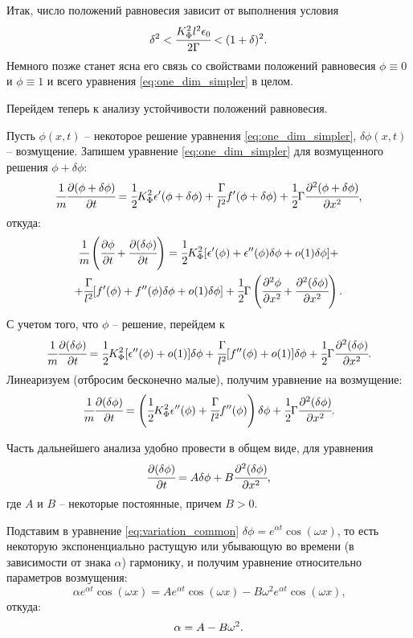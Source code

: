 Итак, число положений равновесия зависит от выполнения условия
\begin{equation}
	\delta^2 < \cfrac{K_\Phi^2 l^2 \epsilon_0}{2 \Gamma} < (1 + \delta)^2 {\text{.}}
	\label{cond:equilibriums_number}
\end{equation}
Немного позже станет ясна его связь со свойствами положений равновесия $\phi \equiv 0$ и $\phi \equiv 1$ и всего уравнения \eqref{eq:one_dim_simpler} в целом.

Перейдем теперь к анализу устойчивости положений равновесия.

Пусть $\phi(x, t)$ -- некоторое решение уравнения \eqref{eq:one_dim_simpler}, $\delta \phi(x, t)$ -- возмущение. Запишем уравнение \eqref{eq:one_dim_simpler} для возмущенного решения $\phi + \delta \phi$:
$$\cfrac{1}{m} \cfrac{\partial (\phi + \delta \phi)}{\partial t} = \cfrac{1}{2} K_\Phi^2 \epsilon'(\phi + \delta \phi) + \cfrac{\Gamma}{l^2} f'(\phi + \delta \phi) + \cfrac{1}{2} \Gamma \cfrac{\partial^2 (\phi + \delta \phi)}{\partial x^2} {\text{,}}$$
откуда:
\begin{multline*}
	\cfrac{1}{m} \left( \cfrac{\partial \phi}{\partial t} + \cfrac{\partial (\delta \phi)}{\partial t} \right) = \cfrac{1}{2} K_\Phi^2 [\epsilon'(\phi) + \epsilon''(\phi) \delta \phi + o(1) \delta \phi] + \\ + \cfrac{\Gamma}{l^2} [f'(\phi) + f''(\phi) \delta \phi + o(1) \delta \phi] + \cfrac{1}{2} \Gamma \left( \cfrac{\partial^2 \phi}{\partial x^2} + \cfrac{\partial^2 (\delta \phi)}{\partial x^2} \right) {\text{.}}
\end{multline*}
С учетом того, что $\phi$ -- решение, перейдем к
$$\cfrac{1}{m} \cfrac{\partial (\delta \phi)}{\partial t} = \cfrac{1}{2} K_\Phi^2 [\epsilon''(\phi) + o(1)] \delta \phi + \cfrac{\Gamma}{l^2} [f''(\phi) + o(1)] \delta \phi + \cfrac{1}{2} \Gamma \cfrac{\partial^2 (\delta \phi)}{\partial x^2} {\text{.}}$$
Линеаризуем (отбросим бесконечно малые), получим уравнение на возмущение:
\begin{equation}
	\cfrac{1}{m} \cfrac{\partial (\delta \phi)}{\partial t} = \left(\cfrac{1}{2} K_\Phi^2 \epsilon''(\phi) + \cfrac{\Gamma}{l^2} f''(\phi) \right) \delta \phi + \cfrac{1}{2} \Gamma \cfrac{\partial^2 (\delta \phi)}{\partial x^2} {\text{.}}
	\label{eq:variation}
\end{equation}

Часть дальнейшего анализа удобно провести в общем виде, для уравнения
\begin{equation}
	\cfrac{\partial (\delta \phi)}{\partial t} = A \delta \phi + B \cfrac{\partial^2 (\delta \phi)}{\partial x^2} {\text{,}}
	\label{eq:variation_common}
\end{equation}
где $A$ и $B$ -- некоторые постоянные, причем $B > 0$.

Подставим в уравнение \eqref{eq:variation_common} $\delta \phi = e^{\alpha t} \cos(\omega x)$, то есть некоторую экспоненциально растущую или убывающую во времени (в зависимости от знака $\alpha$) гармонику, и получим уравнение относительно параметров возмущения:
$$\alpha e^{\alpha t} \cos(\omega x) = A e^{\alpha t} \cos(\omega x) - B \omega^2 e^{\alpha t} \cos(\omega x) \text{,}$$
откуда:
\begin{equation}
	\alpha = A - B \omega^2 {\text{.}}
	\label{eq:exponent_coefficient}
\end{equation}

